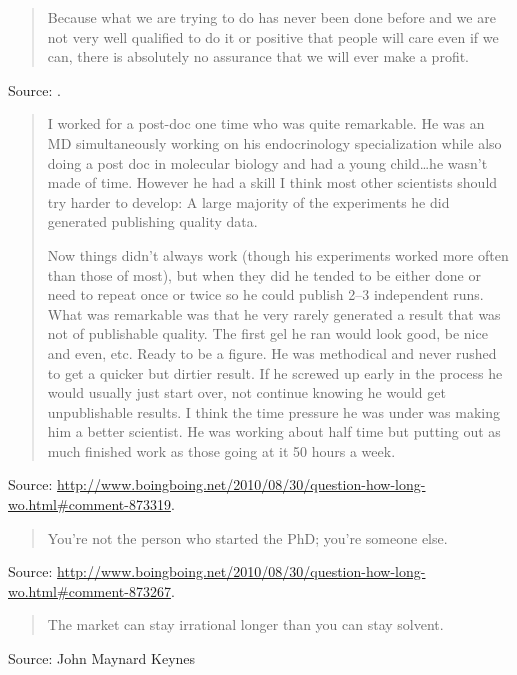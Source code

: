 \documentclass[a4paper]{article}
\begin{document}
\begin{quote}
	Because what we are trying to do has never been done
	before and we are not very well qualified to do it or
	positive that people will care even if we can, there is
	absolutely no assurance that we will ever make a profit.
\end{quote}
Source: \citet[p.~66]{Tobias1970}.
\medskip

\begin{quote}
	I worked for a post-doc one time who was quite remarkable. He was
	an MD simultaneously working on his endocrinology specialization
	while also doing a post doc in molecular biology and had a
	young child\ldots he wasn't made of time. However he had a skill
	I think most other scientists should try harder to develop:
	A large majority of the experiments he did generated publishing
	quality data.

	Now things didn't always work (though his experiments worked
	more often than those of most), but when they did he tended
	to be either done or need to repeat once or twice so he could
	publish 2--3 independent runs. What was remarkable was that
	he very rarely generated a result that was not of publishable
	quality. The first gel he ran would look good, be nice and even,
	etc. Ready to be a figure. He was methodical and never rushed to
	get a quicker but dirtier result. If he screwed up early in the
	process he would usually just start over, not continue knowing
	he would get unpublishable results. I think the time pressure
	he was under was making him a better scientist. He was working
	about half time but putting out as much finished work as those
	going at it 50 hours a week.
\end{quote}
Source: \url{http://www.boingboing.net/2010/08/30/question-how-long-wo.html#comment-873319}.
\medskip

\begin{quote}
	You're not the person who started the PhD; you're someone else.
\end{quote}
Source: \url{http://www.boingboing.net/2010/08/30/question-how-long-wo.html#comment-873267}.
\medskip

\begin{quote}
	The market can stay irrational longer than you can stay solvent.
\end{quote}
Source: John Maynard Keynes
\medskip
\end{document}
